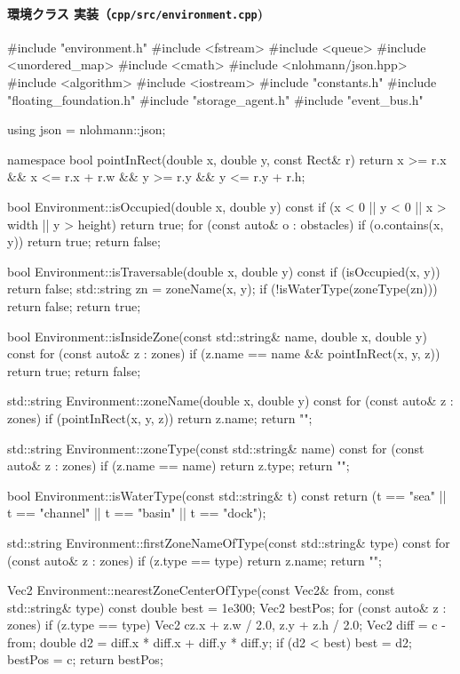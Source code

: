 \documentclass[10pt,letterpaper]{jsarticle}
\begin{document}
\paragraph{環境クラス 実装（\texttt{cpp/src/environment.cpp})}
\begin{cppcode}
#include "environment.h"
#include <fstream>
#include <queue>
#include <unordered_map>
#include <cmath>
#include <nlohmann/json.hpp>
#include <algorithm>
#include <iostream>
#include "constants.h"
#include "floating_foundation.h"
#include "storage_agent.h"
#include "event_bus.h"

using json = nlohmann::json;

namespace {
    bool pointInRect(double x, double y, const Rect& r) {
        return x >= r.x && x <= r.x + r.w && y >= r.y && y <= r.y + r.h;
    }
}

bool Environment::isOccupied(double x, double y) const {
    if (x < 0 || y < 0 || x > width || y > height) return true;
    for (const auto& o : obstacles) {
        if (o.contains(x, y)) return true;
    }
    return false;
}

bool Environment::isTraversable(double x, double y) const {
    if (isOccupied(x, y)) return false;
    std::string zn = zoneName(x, y);
    if (!isWaterType(zoneType(zn))) return false;
    return true;
}

bool Environment::isInsideZone(const std::string& name, double x, double y) const {
    for (const auto& z : zones) {
        if (z.name == name && pointInRect(x, y, z)) return true;
    }
    return false;
}

std::string Environment::zoneName(double x, double y) const {
    for (const auto& z : zones) {
        if (pointInRect(x, y, z)) return z.name;
    }
    return "";
}

std::string Environment::zoneType(const std::string& name) const {
    for (const auto& z : zones) {
        if (z.name == name) return z.type;
    }
    return "";
}

bool Environment::isWaterType(const std::string& t) const {
    return (t == "sea" || t == "channel" || t == "basin" || t == "dock");
}

std::string Environment::firstZoneNameOfType(const std::string& type) const {
    for (const auto& z : zones) if (z.type == type) return z.name;
    return "";
}

Vec2 Environment::nearestZoneCenterOfType(const Vec2& from, const std::string& type) const {
    double best = 1e300;
    Vec2 bestPos{};
    for (const auto& z : zones) if (z.type == type) {
        Vec2 c{z.x + z.w / 2.0, z.y + z.h / 2.0};
        Vec2 diff = c - from;
        double d2 = diff.x * diff.x + diff.y * diff.y;
        if (d2 < best) {
            best = d2;
            bestPos = c;
        }
    }
    return bestPos;
}


\end{cppcode}
\end{document}
